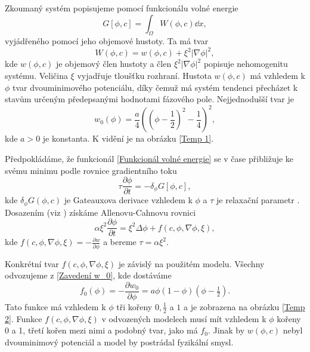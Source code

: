 Zkoumaný systém popisujeme pomocí funkcionálu volné energie
\begin{equation}\label{Funkcionál volné energie}
    G[\phi, c] = \int_\Omega W(\phi, c) \dd x,
\end{equation}
vyjádřeného pomocí jeho objemové hustoty.
Ta má tvar
\begin{equation}
    W(\phi, c) = w(\phi, c) + \xi^2 \left\vert \nabla \phi \right\vert^2,
\end{equation}
kde \(w(\phi, c)\) je objemový člen hustoty a člen \(\xi^2 \left\vert \nabla \phi \right\vert^2 \) popisuje nehomogenitu systému.
Veličina \(\xi\) vyjadřuje tloušťku rozhraní.
Hustota \(w(\phi, c)\) má vzhledem k \(\phi\) tvar dvouminimového potenciálu, díky čemuž má systém tendenci přecházet k stavům určeným předepsanými hodnotami fázového pole.
Nejjednodušší tvar je
\begin{equation}\label{Zavedení w_0}
    w_0(\phi) = \frac{a}{4}\left(\left(\phi-\frac{1}{2}\right)^2 - \frac{1}{4}\right)^2,
\end{equation}
kde \(a > 0\) je konstanta.
K vidění je na obrázku \ref{Temp 1}.

Předpokládáme, že funkcionál \eqref{Funkcionál volné energie} se v čase přibližuje ke svému minimu podle rovnice gradientního toku
\begin{equation}
    \tau \frac{\partial \phi}{\partial t} = - \delta_\phi G[\phi, c],
\end{equation}
kde \(\delta_\phi G(\phi, c)\) je Gateauxova derivace vzhledem k \(\phi\) a \(\tau\) je relaxační parametr \cite{Beneš_01}. 
Dosazením (viz \cite{Beneš_97}) získáme Allenovu-Cahnovu rovnici
\begin{equation}\label{Obecna ACE}
    \alpha \xi^2 \frac{\partial \phi}{\partial t} = \xi^2 \Delta \phi + f(c, \phi, \nabla \phi, \xi),
\end{equation}
kde \(f(c, \phi, \nabla \phi, \xi) = - \frac{\partial w}{\partial \phi}\) a bereme \(\tau = \alpha \xi^2\).

Konkrétní tvar \(f(c, \phi, \nabla \phi, \xi)\) je závislý na použitém modelu.
Všechny odvozujeme z \eqref{Zavedení w_0}, kde dostáváme
\begin{equation}\label{Jednoduchý tvar f}
    f_0(\phi) = - \frac{\partial w_0}{\partial \phi} = a \phi \left(1-\phi\right) \left(\phi-\tfrac{1}{2}\right).
\end{equation}
Tato funkce má vzhledem k \(\phi\) tři kořeny \(0, \frac{1}{2}\) a \(1\) a je zobrazena na obrázku \ref{Temp 2}.
Funkce \(f(c, \phi, \nabla \phi, \xi)\) v odvozených modelech musí mít vzhledem k \(\phi\) kořeny 0 a 1, třetí kořen mezi nimi a podobný tvar, jako má \(f_0\).
Jinak by \(w(\phi, c)\) nebyl dvouminimový potenciál a model by postrádal fyzikální smysl.

